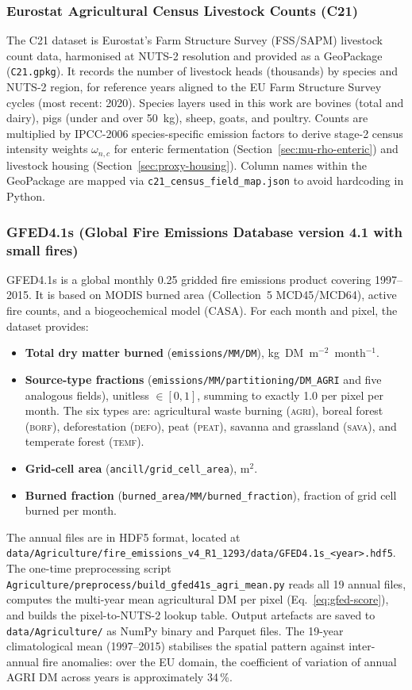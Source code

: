 \subsubsection*{Eurostat Agricultural Census Livestock Counts (C21)}
\label{app:c21}
The C21 dataset is Eurostat's Farm Structure Survey (FSS/SAPM) livestock count data, harmonised at NUTS-2 resolution and provided as a GeoPackage (\texttt{C21.gpkg}). It records the number of livestock heads (thousands) by species and NUTS-2 region, for reference years aligned to the EU Farm Structure Survey cycles (most recent: 2020). Species layers used in this work are bovines (total and dairy), pigs (under and over 50~kg), sheep, goats, and poultry. Counts are multiplied by IPCC-2006 species-specific emission factors to derive stage-2 census intensity weights $\omega_{n,c}$ for enteric fermentation (Section~\ref{sec:mu-rho-enteric}) and livestock housing (Section~\ref{sec:proxy-housing}). Column names within the GeoPackage are mapped via \texttt{c21\_census\_field\_map.json} to avoid hardcoding in Python.

\subsubsection*{GFED4.1s (Global Fire Emissions Database version 4.1 with small fires)}
\label{app:CGEF4.1s}
GFED4.1s \citep{vanderwerf2017,giglio2013} is a global monthly 0.25\textdegree{} gridded fire emissions product covering 1997--2015. It is based on MODIS burned area (Collection~5 MCD45/MCD64), active fire counts, and a biogeochemical model (CASA). For each month and pixel, the dataset provides:
\begin{itemize}
  \item \textbf{Total dry matter burned} (\texttt{emissions/MM/DM}), kg~DM~m$^{-2}$~month$^{-1}$.
  \item \textbf{Source-type fractions} (\texttt{emissions/MM/partitioning/DM\_AGRI} and five analogous fields), unitless $\in [0,1]$, summing to exactly 1.0 per pixel per month. The six types are: agricultural waste burning (\textsc{agri}), boreal forest (\textsc{borf}), deforestation (\textsc{defo}), peat (\textsc{peat}), savanna and grassland (\textsc{sava}), and temperate forest (\textsc{temf}).
  \item \textbf{Grid-cell area} (\texttt{ancill/grid\_cell\_area}), m$^2$.
  \item \textbf{Burned fraction} (\texttt{burned\_area/MM/burned\_fraction}), fraction of grid cell burned per month.
\end{itemize}
The annual files are in HDF5 format, located at \texttt{data/Agriculture/fire\_emissions\_v4\_R1\_1293/data/GFED4.1s\_<year>.hdf5}. The one-time preprocessing script \texttt{Agriculture/preprocess/build\_gfed41s\_agri\_mean.py} reads all 19 annual files, computes the multi-year mean agricultural DM per pixel (Eq.~\ref{eq:gfed-score}), and builds the pixel-to-NUTS-2 lookup table. Output artefacts are saved to \texttt{data/Agriculture/} as NumPy binary and Parquet files. The 19-year climatological mean (1997--2015) stabilises the spatial pattern against inter-annual fire anomalies: over the EU domain, the coefficient of variation of annual AGRI DM across years is approximately 34\,\%.

